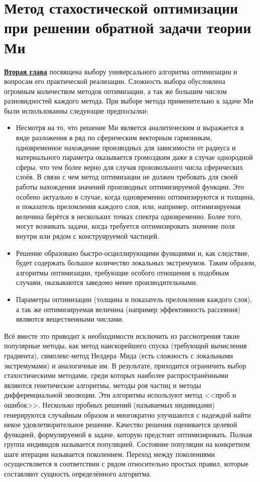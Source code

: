 \chapter{Метод стахостической оптимизации при решении обратной задачи
  теории Ми} \label{chapt2}


\underline{\textbf{Вторая глава}} посвящена выбору универсального
алгоритма оптимизации и вопросам его практической
реализации. Сложность выбора обусловлена огромным количеством методов
оптимизации, а так же большим числом разновидностей каждого
метода. При выборе метода применительно к задаче Ми были использованны
следующие предпосылки:
\begin{itemize}
\item Несмотря на то, что решение Ми является аналитическим и
  выражается в виде разложения в ряд по сферическим векторным
  гармоникам, одновременное нахождение производных для зависимости от
  радиуса и материального параметра оказывается громоздким даже в
  случае однородной сферы, что тем более верно для случая
  произвольного числа сферических слоёв.  В связи с чем метод
  оптимизации не должен требовать для своей работы нахождения значений
  производных оптимизируемой функции.  Это особено актуально в случае,
  когда одновременно оптимизируются и толщина, и показатель
  преломления каждого слоя, или, например, оптимизируемая величина
  берётся в нескольких точках спектра одновременно.  Более того, могут
  возникать задачи, когда требуется оптимизировать значение поля внутри
  или рядом с конструируемой частицей.
\item Решение образовано быстро-осциллирующими функциями и, как
  следствие, будет содержать большое количество локальных
  экстремумов. Таким образом, алгоритмы оптимизации, требующие особого
  отношения к подобным случаям, оказываются заведомо менее
  производительными.
\item Параметры оптимизации (толщина и показатель
  преломления каждого слоя), а так же оптимизируемая величина
  (например эффективность рассеяния) являются
  вещественными числами.
\end{itemize}

Всё вместе это приводит к необходимости исключить из рассмотрения
такие популярные методы, как метод наискорейшего спуска (требующий
вычисления градиента), симплекс-метод Нелдера--Мида (есть сложность с
локальными экстремумами) и аналогичные им. В результате, приходится
ограничить выбор стахостическими методами, среди которых наиболее
распространёнными являются генетические алгоритмы, методы роя частиц и
методы дифференциальной эволюции.  Эти алгоритмы используют метод
<<проб и ошибок>>.  Несколько пробных решений (называемых индивидами)
генерируются случайным образом и многократно улучшаются с надеждой
найти некое удовлетворительное решение. Качество решения оценивается
целевой функцией, формулируемой в задаче, которую предстоит
оптимизировать.  Полная группа индивидов называется популяцией.
Состояние популяции на конкретном шаге итерации называется поколением.
Переход между поколениями осуществляется в соответствии с рядом
относительно простых правил, которые составляют сущность определённого
алгоритма.


